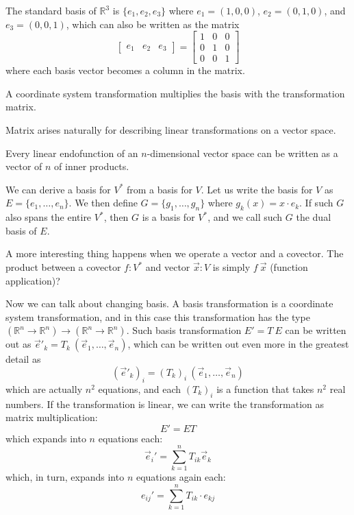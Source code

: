 The standard basis of $\mathbb{R}^3$
is $\{e_1,e_2,e_3\}$
where $e_1 = (1,0,0)$, $e_2 = (0,1,0)$, and $e_3 = (0,0,1)$,
which can also be written as the matrix
\[
\begin{bmatrix}e_1&e_2&e_3\end{bmatrix}
= \begin{bmatrix}1&0&0\\0&1&0\\0&0&1\end{bmatrix}
\]
where each basis vector becomes a column in the matrix.

A coordinate system transformation multiplies the basis with the transformation matrix.

Matrix arises naturally for describing linear transformations on a vector space.

Every linear endofunction of an $n$-dimensional vector space can be written as a vector of $n$ of inner products.

We can derive a basis for $V^*$ from a basis for $V$.
Let us write the basis for $V$ as \(E = \{ e_1, \ldots, e_n\}\).
We then define $G = \{ g_1, \ldots, g_n \}$ where \(g_k(x) = x \cdot e_k\).
If such $G$ also spans the entire $V^*$,
then $G$ is a basis for $V^*$,
and we call such $G$ the dual basis of $E$.

A more interesting thing happens when we operate a vector and a covector.
The product between a covector $f : V^*$ and vector $\vec{x} : V$
is simply $f~\vec{x}$ (function application)?

Now we can talk about changing basis.
A basis transformation is a coordinate system transformation,
and in this case this transformation has the type
$(\mathbb{R}^n \to \mathbb{R}^n) \to (\mathbb{R}^n \to \mathbb{R}^n)$.
Such basis transformation $E' = T~E$ can be written out
as $\vec{e}'_k = T_k~(\vec{e}_1, \ldots, \vec{e}_n)$,
which can be written out even more in the greatest detail as
\[
(\vec{e}'_k)_i = (T_k)_i~(\vec{e}_1, \ldots, \vec{e}_n)
\]
which are actually $n^2$ equations,
and each $(T_k)_i$ is a function that takes $n^2$ real numbers.
If the transformation is linear,
we can write the transformation as matrix multiplication:
\[
E' = ET
\]
which expands into $n$ equations each:
\[
\vec{e}_i' = \sum_{k=1}^n T_{ik} \vec{e}_k
\]
which, in turn, expands into $n$ equations again each:
\[
e_{ij}' = \sum_{k=1}^n T_{ik} \cdot e_{kj}
\]


